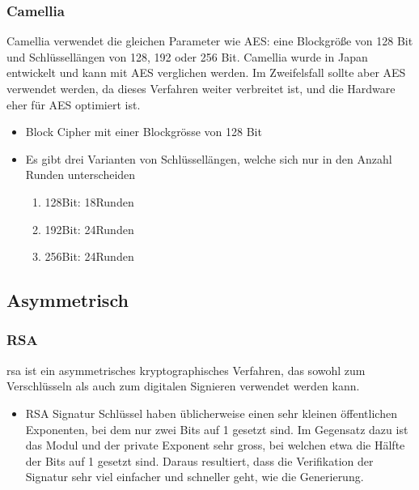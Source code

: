 \subsubsection{Camellia}
Camellia verwendet die gleichen Parameter wie AES: eine Blockgröße von 128 Bit und Schlüssellängen von 128, 192 oder 256 Bit. Camellia wurde in Japan entwickelt und kann mit AES verglichen werden. Im Zweifelsfall sollte aber AES verwendet werden, da dieses Verfahren weiter verbreitet ist, und die Hardware eher für AES optimiert ist.
\begin{itemize}
	\item Block Cipher mit einer Blockgrösse von 128 Bit
	\item Es gibt drei Varianten von Schlüssellängen, welche sich nur in den Anzahl Runden unterscheiden
	\begin{enumerate}
		\item 128Bit: 18Runden
		\item 192Bit: 24Runden
		\item 256Bit: 24Runden
	\end{enumerate}
\end{itemize}

\subsection{Asymmetrisch}
\subsubsection{RSA}
\gls{rsa} ist ein asymmetrisches kryptographisches Verfahren, das sowohl zum Verschlüsseln als auch zum digitalen Signieren verwendet werden kann.
\begin{itemize}
	\item RSA Signatur Schlüssel haben üblicherweise einen sehr kleinen öffentlichen Exponenten, bei dem nur zwei Bits auf 1 gesetzt sind. Im Gegensatz dazu ist das Modul und der private Exponent sehr gross, bei welchen etwa die Hälfte der Bits auf 1 gesetzt sind. Daraus resultiert, dass die Verifikation der Signatur sehr viel einfacher und schneller geht, wie die Generierung.
\end{itemize}

